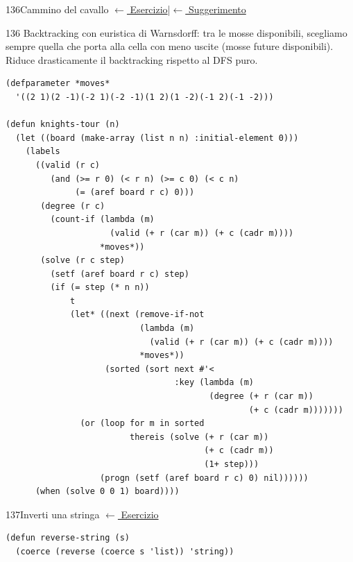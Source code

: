 \label{sol:136}
\begin{solbox}{136}{Cammino del cavallo}
\small\color{black!55}\hyperref[ex:136]{$\leftarrow$ Esercizio}\enspace\textcolor{black!30}{|}\enspace\hyperref[hint:136]{$\leftarrow$ Suggerimento}\normalsize\color{black}
\solriferimento
\begin{ragionamentoBox}{136}
Backtracking con euristica di Warnsdorff: tra le mosse
disponibili, scegliamo sempre quella che porta alla cella
con meno uscite (mosse future disponibili).
Riduce drasticamente il backtracking rispetto al DFS puro.
\end{ragionamentoBox}
\begin{lstlisting}
(defparameter *moves*
  '((2 1)(2 -1)(-2 1)(-2 -1)(1 2)(1 -2)(-1 2)(-1 -2)))

(defun knights-tour (n)
  (let ((board (make-array (list n n) :initial-element 0)))
    (labels
      ((valid (r c)
         (and (>= r 0) (< r n) (>= c 0) (< c n)
              (= (aref board r c) 0)))
       (degree (r c)
         (count-if (lambda (m)
                     (valid (+ r (car m)) (+ c (cadr m))))
                   *moves*))
       (solve (r c step)
         (setf (aref board r c) step)
         (if (= step (* n n))
             t
             (let* ((next (remove-if-not
                           (lambda (m)
                             (valid (+ r (car m)) (+ c (cadr m))))
                           *moves*))
                    (sorted (sort next #'<
                                  :key (lambda (m)
                                         (degree (+ r (car m))
                                                 (+ c (cadr m)))))))
               (or (loop for m in sorted
                         thereis (solve (+ r (car m))
                                        (+ c (cadr m))
                                        (1+ step)))
                   (progn (setf (aref board r c) 0) nil))))))
      (when (solve 0 0 1) board))))
\end{lstlisting}
\end{solbox}


\label{sol:137}
\begin{solbox}{137}{Inverti una stringa}
\small\color{black!55}\hyperref[ex:137]{$\leftarrow$ Esercizio}\normalsize\color{black}
\begin{lstlisting}
(defun reverse-string (s)
  (coerce (reverse (coerce s 'list)) 'string))
\end{lstlisting}
\end{solbox}

